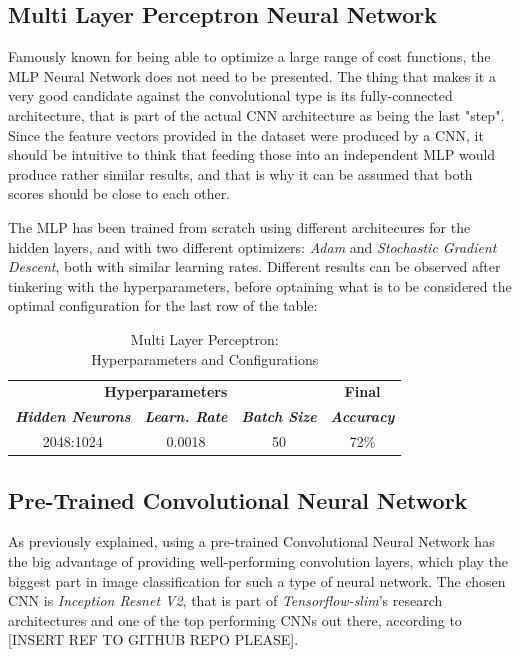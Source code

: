 \documentclass[conference]{IEEEtran}
\begin{document}
\subsection{Multi Layer Perceptron Neural Network}
    Famously known for being able to optimize a large range of cost functions, the MLP Neural Network does not need to be presented. The thing that makes it a very good candidate against the convolutional type is its fully-connected architecture, that is part of the actual CNN architecture as being the last "step".
Since the feature vectors provided in the dataset were produced by a CNN, it should be intuitive to think that feeding those into an independent MLP would produce rather similar results, and that is why it can be assumed that both scores should be close to each other.

The MLP has been trained from scratch using different architecures for the hidden layers, and with two different optimizers: \emph{Adam} and \emph{Stochastic Gradient Descent}, both with similar learning rates. Different results can be observed after tinkering with the hyperparameters, before optaining what is to be considered the optimal configuration for the last row of the table:

\begin{table}[htbp]
\caption{Multi Layer Perceptron: \\ Hyperparameters and Configurations}
\begin{center}
\begin{tabular}{|c|c|c|c|}
\hline
\multicolumn{3}{|c|}{\textbf{Hyperparameters}}&\textbf{Final} \\
\cline{1-3} 
\textbf{\textit{Hidden Neurons}}& \textbf{\textit{Learn. Rate}}& \textbf{\textit{Batch Size}} & \textbf{\textit{Accuracy}} \\
\hline
2048:1024& 0.0018 & 50 & 72\% \\
\hline
\end{tabular}
\label{tab1}
\end{center}
\end{table}


\subsection{Pre-Trained Convolutional Neural Network}
    As previously explained, using a pre-trained Convolutional Neural Network has the big advantage of providing well-performing convolution layers, which play the biggest part in image classification for such a type of neural network.
The chosen CNN is \emph{Inception Resnet V2}, that is part of \emph{Tensorflow-slim}'s research architectures and one of the top performing CNNs out there, according to [INSERT REF TO GITHUB REPO PLEASE].
\end{document}
